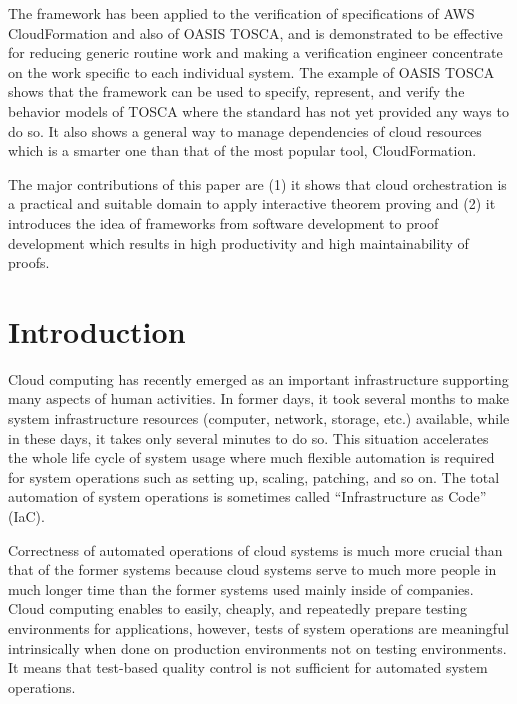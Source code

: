 \documentclass[12pt]{report}
\begin{document}
The framework has been applied to the verification of specifications
of AWS CloudFormation and also of OASIS TOSCA, and is demonstrated to
be effective for reducing generic routine work and making a
verification engineer concentrate on the work specific to each
individual system. The example of OASIS TOSCA shows that the framework
can be used to specify, represent, and verify the behavior models of
TOSCA where the standard has not yet provided any ways to do so. It
also shows a general way to manage dependencies of cloud resources
which is a smarter one than that of the most popular tool,
CloudFormation.

The major contributions of this paper are (1) it shows that cloud
orchestration is a practical and suitable domain to apply interactive
theorem proving and (2) it introduces the idea of frameworks from
software development to proof development which results in high
productivity and high maintainability of proofs.


\tableofcontents
\listoffigures
\newpage
{}
\setcounter{page}{1}

\chapter{Introduction}
Cloud computing has recently emerged as an important infrastructure
supporting many aspects of human activities. In former days, it took
several months to make system infrastructure resources (computer,
network, storage, etc.) available, while in these days, it takes only
several minutes to do so. This situation accelerates the whole life
cycle of system usage where much flexible automation is required for
system operations such as setting up, scaling, patching, and so on.
The total automation of system operations is sometimes called
``Infrastructure as Code'' (IaC).

Correctness of automated operations of cloud systems is much more
crucial than that of the former systems because cloud systems serve to
much more people in much longer time than the former systems used
mainly inside of companies. Cloud computing enables to easily,
cheaply, and repeatedly prepare testing environments for applications,
however, tests of system operations are meaningful intrinsically when
done on production environments not on testing environments.  It means
that test-based quality control is not sufficient for automated
system operations.
\end{document}
